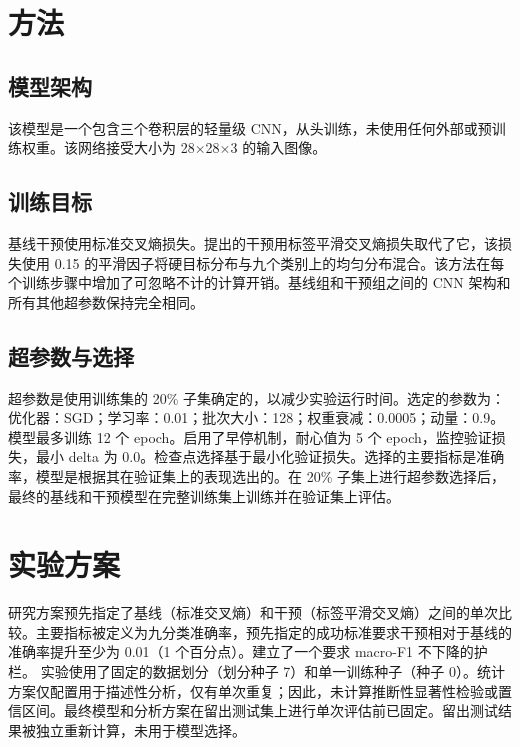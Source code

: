 \documentclass[10pt]{article}
\begin{document}
\section{方法}
\subsection{模型架构}
该模型是一个包含三个卷积层的轻量级 CNN，从头训练，未使用任何外部或预训练权重。该网络接受大小为 28\ensuremath{\times}28\ensuremath{\times}3 的输入图像。
\subsection{训练目标}
基线干预使用标准交叉熵损失。提出的干预用标签平滑交叉熵损失取代了它，该损失使用 0.15 的平滑因子将硬目标分布与九个类别上的均匀分布混合。该方法在每个训练步骤中增加了可忽略不计的计算开销。基线组和干预组之间的 CNN 架构和所有其他超参数保持完全相同。
\subsection{超参数与选择}
超参数是使用训练集的 20\% 子集确定的，以减少实验运行时间。选定的参数为：优化器：SGD；学习率：0.01；批次大小：128；权重衰减：0.0005；动量：0.9。模型最多训练 12 个 epoch。启用了早停机制，耐心值为 5 个 epoch，监控验证损失，最小 delta 为 0.0。检查点选择基于最小化验证损失。选择的主要指标是准确率，模型是根据其在验证集上的表现选出的。在 20\% 子集上进行超参数选择后，最终的基线和干预模型在完整训练集上训练并在验证集上评估。
\section{实验方案}
研究方案预先指定了基线（标准交叉熵）和干预（标签平滑交叉熵）之间的单次比较。主要指标被定义为九分类准确率，预先指定的成功标准要求干预相对于基线的准确率提升至少为 0.01（1 个百分点）。建立了一个要求 macro-F1 不下降的护栏。
实验使用了固定的数据划分（划分种子 7）和单一训练种子（种子 0）。统计方案仅配置用于描述性分析，仅有单次重复；因此，未计算推断性显著性检验或置信区间。最终模型和分析方案在留出测试集上进行单次评估前已固定。留出测试结果被独立重新计算，未用于模型选择。
\end{document}
